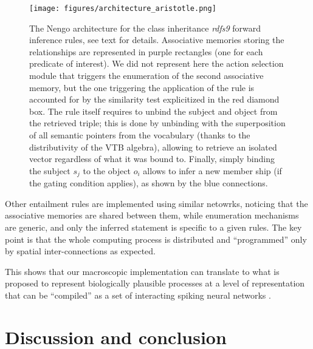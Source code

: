 \documentclass[sn-mathphys]{sn-jnl}
\begin{document}
\begin{sidewaysfigure}[htbp]
\centerline{\texttt{[image: figures/architecture\_aristotle.png]}}
\caption{The Nengo architecture for the class inheritance \textit{rdfs9} forward inference rules, see text for details. Associative memories storing the relationships are represented in purple rectangles (one for each predicate of interest). We did not represent here the action selection module that triggers the enumeration of the second associative memory, but the one triggering the application of the rule is accounted for by the similarity test explicitized in the red diamond box. The rule itself requires to unbind the subject and object from the retrieved triple; this is done by unbinding with the superposition of all semantic pointers from the vocabulary (thanks to the distributivity of the VTB algebra), allowing to retrieve an isolated vector regardless of what it was bound to. Finally, simply binding the subject $s_j$ to the object $o_i$ allows to infer a new member ship (if the gating condition applies), as shown by the blue connections.}
\label{architecture_aristotle}
\end{sidewaysfigure}


Other entailment rules are implemented using similar netowrks, noticing that the associative memories are shared between them, while enumeration mechanisms are generic, and only the inferred statement is specific to a given rules. The key point is that the whole computing process is distributed and ``programmed'' only by spatial inter-connections as expected.

This shows that our macroscopic implementation can translate to what is proposed to represent biologically plausible processes at a level of representation that can be ``compiled'' as a set of interacting spiking neural networks \cite{eliasmith_how_2013}.

\section{Discussion and conclusion}
\end{document}
